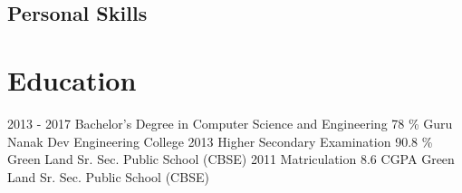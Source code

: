 \documentclass[]{friggeri-cv}
\begin{document}
\begin{aside}
  \section{Personal Skills}
\end{aside}

\section{Education}
\begin{entrylist}
  \entry
    {2013 - 2017}
    {Bachelor's Degree in Computer Science and Engineering}
    {78 \%}
    {Guru Nanak Dev Engineering College}
  \entry
    {2013}
    {Higher Secondary Examination}
    {90.8 \%}
    {Green Land Sr. Sec. Public School (CBSE)}
    \entry
    {2011}
    {Matriculation}
    {8.6 CGPA}
    {Green Land Sr. Sec. Public School (CBSE) }
\end{entrylist}
\end{document}
